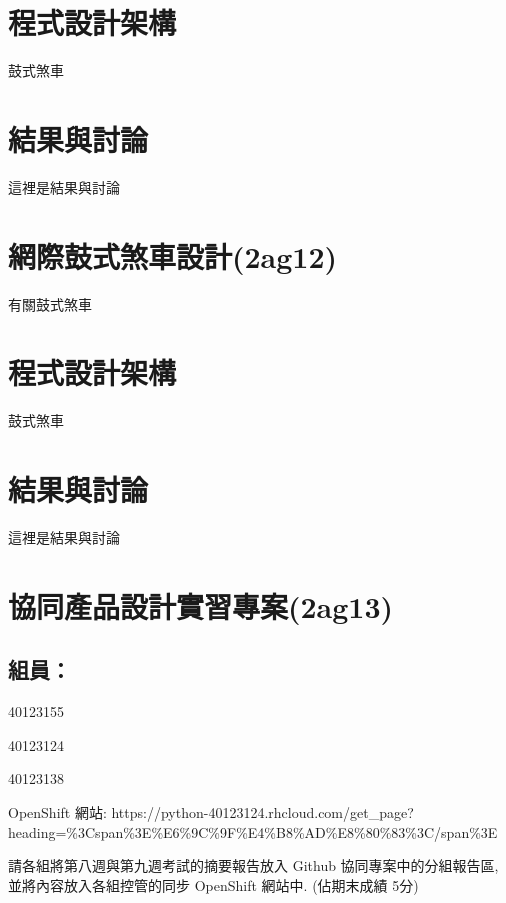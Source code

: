 \documentclass[]{article}
\begin{document}
\section{程式設計架構}\label{ux7a0bux5f0fux8a2dux8a08ux67b6ux69cb-2}

鼓式煞車

\section{結果與討論}\label{ux7d50ux679cux8207ux8a0eux8ad6-2}

這裡是結果與討論

\section{網際鼓式煞車設計(2ag12)}\label{ux7db2ux969bux9f13ux5f0fux715eux8ecaux8a2dux8a082ag12}

有關鼓式煞車

\section{程式設計架構}\label{ux7a0bux5f0fux8a2dux8a08ux67b6ux69cb-3}

鼓式煞車

\section{結果與討論}\label{ux7d50ux679cux8207ux8a0eux8ad6-3}

這裡是結果與討論

\section{協同產品設計實習專案(2ag13)}\label{ux5354ux540cux7522ux54c1ux8a2dux8a08ux5be6ux7fd2ux5c08ux68482ag13}

\subsection{組員：}\label{ux7d44ux54e1-1}

40123155

40123124

40123138

OpenShift 網站:
https://python-40123124.rhcloud.com/get\_page?heading=\%3Cspan\%3E\%E6\%9C\%9F\%E4\%B8\%AD\%E8\%80\%83\%3C/span\%3E

請各組將第八週與第九週考試的摘要報告放入 Github 協同專案中的分組報告區,
並將內容放入各組控管的同步 OpenShift 網站中. (佔期末成績 5分)
\end{document}

